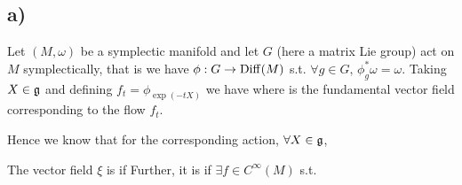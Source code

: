 \documentclass{article}
\begin{document}
\subsection{a)}

Let $(M,\omega)$ be a symplectic manifold and let $G$ (here a matrix Lie group) act on $M$ symplectically, that is we have $\phi:G \to \operatorname{Diff}(M)$ s.t. $\forall g \in G, \, \phi_g^\ast \omega = \omega$. Taking $X \in \mathfrak{g}$ and defining $f_t = \phi_{\exp(-tX)}$ we have 
where is the fundamental vector field corresponding to the flow $f_t$. 

\begin{fact}
\end{fact}
Hence we know that for the corresponding action, $\forall X \in \mathfrak{g}$, 
\begin{definition}
The vector field $\xi$ is  if
Further, it is  if $\exists f\in C^\infty(M)$ s.t. 
\end{definition}
\end{document}
